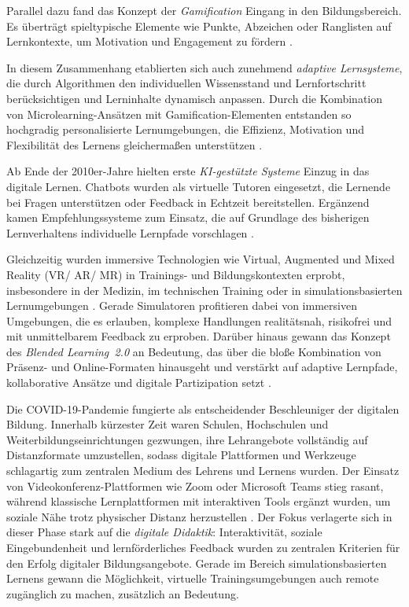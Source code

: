 Parallel dazu fand das Konzept der \textit{Gamification} Eingang in den Bildungsbereich. Es überträgt spieltypische Elemente wie Punkte, Abzeichen oder Ranglisten auf Lernkontexte, um Motivation und Engagement zu fördern \parencites[S.~452]{schlag_gamifizierung_2021}[S.~14]{niegemann_kompendium_2008}.

In diesem Zusammenhang etablierten sich auch zunehmend \textit{adaptive Lernsysteme}, die durch Algorithmen den individuellen Wissensstand und Lernfortschritt berücksichtigen und Lerninhalte dynamisch anpassen. Durch die Kombination von Microlearning-Ansätzen mit Gamification-Elementen entstanden so hochgradig personalisierte Lernumgebungen, die Effizienz, Motivation und Flexibilität des Lernens gleichermaßen unterstützen \parencite[S.~1f]{katsaris_adaptive_2021}.

Ab Ende der 2010er-Jahre hielten erste \textit{KI-gestützte Systeme} Einzug in das digitale Lernen. Chatbots wurden als virtuelle Tutoren eingesetzt, die Lernende bei Fragen unterstützen oder Feedback in Echtzeit bereitstellen. Ergänzend kamen Empfehlungssysteme zum Einsatz, die auf Grundlage des bisherigen Lernverhaltens individuelle Lernpfade vorschlagen \parencites[S.~1f]{harry_role_2023}[S.~42ff]{zhai_review_2021}.

Gleichzeitig wurden immersive Technologien wie Virtual, Augmented und Mixed Reality (\acs{VR}/ \acs{AR}/ \acs{MR}) in Trainings- und Bildungskontexten erprobt, insbesondere in der Medizin, im technischen Training oder in simulationsbasierten Lernumgebungen \parencites[S.~3f]{rocha_bicalho_use_2023}[S.~251]{anatolevna_kastornova_international_2022}[S.~2f]{radianti_systematic_2020}. Gerade Simulatoren profitieren dabei von immersiven Umgebungen, die es erlauben, komplexe Handlungen realitätsnah, risikofrei und mit unmittelbarem Feedback zu erproben. Darüber hinaus gewann das Konzept des \textit{Blended Learning~2.0} an Bedeutung, das über die bloße Kombination von Präsenz- und Online-Formaten hinausgeht und verstärkt auf adaptive Lernpfade, kollaborative Ansätze und digitale Partizipation setzt \parencites{seufert_schulleitertagung_2014}{news_aktuell_gmbh_e-learning_2025}.

Die COVID-19-Pandemie fungierte als entscheidender Beschleuniger der digitalen Bildung. Innerhalb kürzester Zeit waren Schulen, Hochschulen und Weiterbildungseinrichtungen gezwungen, ihre Lehrangebote vollständig auf Distanzformate umzustellen, sodass digitale Plattformen und Werkzeuge schlagartig zum zentralen Medium des Lehrens und Lernens wurden. Der Einsatz von Videokonferenz-Plattformen wie Zoom oder Microsoft Teams stieg rasant, während klassische Lernplattformen mit interaktiven Tools ergänzt wurden, um soziale Nähe trotz physischer Distanz herzustellen \parencite[S.~1f]{hodges_torrey_2020}. Der Fokus verlagerte sich in dieser Phase stark auf die \textit{digitale Didaktik}: Interaktivität, soziale Eingebundenheit und lernförderliches Feedback wurden zu zentralen Kriterien für den Erfolg digitaler Bildungsangebote. Gerade im Bereich simulationsbasierten Lernens gewann die Möglichkeit, virtuelle Trainingsumgebungen auch remote zugänglich zu machen, zusätzlich an Bedeutung.

